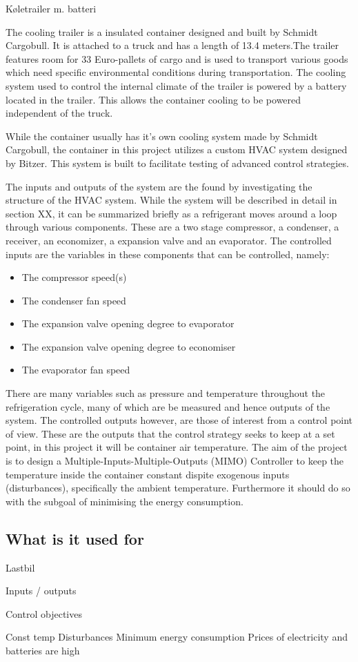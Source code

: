 
Køletrailer m. batteri


The cooling trailer is a insulated container designed and built by Schmidt Cargobull. It is attached to a truck and has a length of 13.4 meters.The trailer features room for 33 Euro-pallets of cargo and is used to transport various goods which need specific environmental conditions during transportation. The cooling system used to control the internal climate of the trailer is powered by a battery located in the trailer. This allows the container cooling to be powered independent of the truck.

While the container usually has it's own cooling system made by Schmidt Cargobull, the container in this project utilizes a custom HVAC system designed by Bitzer. This system is built to facilitate testing of advanced control strategies.

The inputs and outputs of the system are the found by investigating the structure of the HVAC system. While the system will be described in detail in section XX, it can be summarized briefly as a refrigerant moves around a loop through various components. These are a two stage compressor, a condenser, a receiver, an economizer, a expansion valve and an evaporator. The controlled inputs are the variables in these components that can be controlled, namely:

\begin{itemize}
	\item The compressor speed(s)
	\item The condenser fan speed
	\item The expansion valve opening degree to evaporator
	\item The expansion valve opening degree to economiser
	\item The evaporator fan speed
\end{itemize}

There are many variables such as pressure and temperature throughout the refrigeration cycle, many of which are be measured and hence outputs of the system. 
The controlled outputs however, are those of interest from a control point of view. These are the outputs that the control strategy seeks to keep at a set point, in this project it will be container air temperature. The aim of the project is to design a Multiple-Inputs-Multiple-Outputs (MIMO) Controller to keep the temperature inside the container constant dispite exogenous inputs (disturbances), specifically the ambient temperature. Furthermore it should do so with the subgoal of minimising the energy consumption.








\subsection{What is it used for}
	Lastbil
	
	
Inputs / outputs

Control objectives

	Const temp
		Disturbances
	Minimum energy consumption
		Prices of electricity and batteries are high
		
